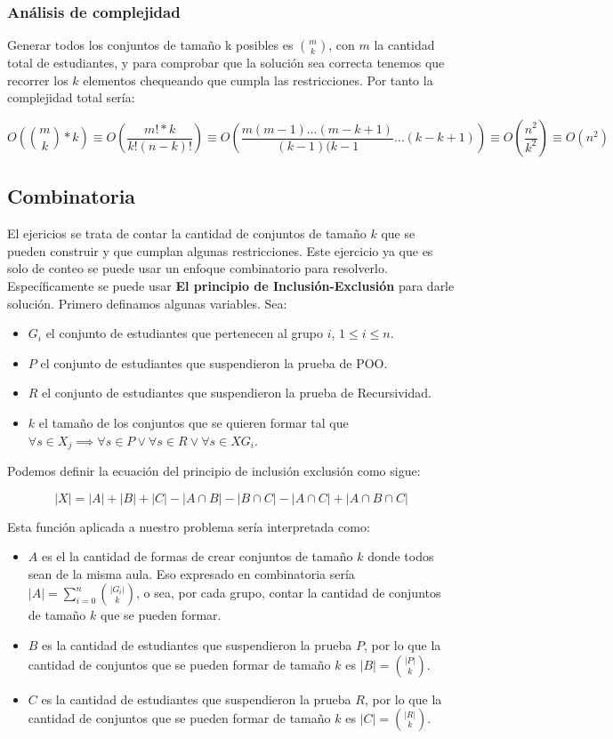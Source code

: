\documentclass{article}
\begin{document}
\subsubsection{Análisis de complejidad}

Generar todos los conjuntos de tamaño k posibles es $m \choose k$, con $m$ la cantidad total de estudiantes, y para comprobar que la solución sea correcta tenemos que recorrer los $k$ elementos chequeando que cumpla las restricciones. Por tanto la complejidad total sería:

    $$  O({m \choose k} * k) \equiv O(\frac{m! * k}{k!(n - k)!}) \equiv O(\frac{m(m - 1) \dotsc (m - k + 1)}{(k - 1)(k - 1} \dotsc (k - k + 1)) \equiv O(\frac{n^2}{k^2}) \equiv O(n^2)$$

\subsection{Combinatoria}

El ejericios se trata de contar la cantidad de conjuntos de tamaño $k$ que se pueden construir y que cumplan algunas restricciones. Este ejercicio ya que es solo de conteo se puede usar un enfoque combinatorio para resolverlo. Específicamente se puede usar \textbf{El principio de Inclusión-Exclusión} para darle solución. Primero definamos algunas variables. Sea:

\begin{itemize}
    \item $G_i$ el conjunto de estudiantes que pertenecen al grupo $i$, $1 \leq i \leq n$.
    \item $P$ el conjunto de estudiantes que suspendieron la prueba de POO.
    \item $R$ el conjunto de estudiantes que suspendieron la prueba de Recursividad.
    \item $k$ el tamaño de los conjuntos que se quieren formar tal que $\forall s \in X_j \implies \forall s \in P \lor \forall s \in R \lor \forall s \in XG_i$.
\end{itemize}

Podemos definir la ecuación del principio de inclusión exclusión como sigue:

$$
   |X| = |A| + |B| + |C| - |A \cap B| - |B \cap C| - |A \cap C| + |A \cap B \cap C| 
$$

Esta función aplicada a nuestro problema sería interpretada como:

\begin{itemize}
    \item $A$ es el la cantidad de formas de crear conjuntos de tamaño $k$ donde todos sean de la misma aula. Eso expresado en combinatoria sería $|A| = \sum_{i=0}^{n} {|G_i| \choose k}$, o sea, por cada grupo, contar la cantidad de conjuntos de tamaño $k$ que se pueden formar.
    \item $B$ es la cantidad de estudiantes que suspendieron la prueba $P$, por lo que la cantidad de conjuntos que se pueden formar de tamaño $k$ es $|B| = {|P| \choose k}$.
    \item $C$ es la cantidad de estudiantes que suspendieron la prueba $R$, por lo que la cantidad de conjuntos que se pueden formar de tamaño $k$ es $|C| = {|R| \choose k}$.
\end{itemize}
\end{document}
